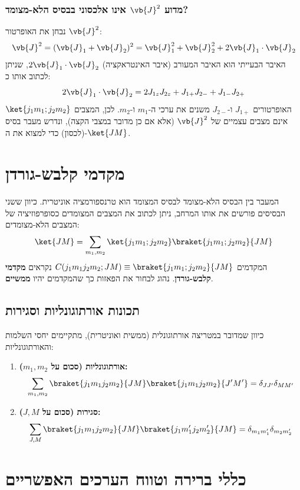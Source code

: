 \subsubsection{מדוע $\vb{J}^2$ אינו אלכסוני בבסיס הלא-מצומד?}
נבחן את האופרטור $\vb{J}^2$:
\[
\vb{J}^2 = (\vb{J}_1 + \vb{J}_2)^2 = \vb{J}_1^2 + \vb{J}_2^2 + 2\vb{J}_1 \cdot \vb{J}_2
\]
האיבר הבעייתי הוא האיבר המעורב (איבר האינטראקציה) $2\vb{J}_1 \cdot \vb{J}_2$, שניתן לכתוב אותו כ:
\[
2\vb{J}_1 \cdot \vb{J}_2 = 2J_{1z}J_{2z} + J_{1+}J_{2-} + J_{1-}J_{2+}
\]
האופרטורים $J_{1+}$ ו-$J_{2-}$ משנים את ערכי ה-$m_1$ ו-$m_2$. לכן, המצבים $\ket{j_1 m_1; j_2 m_2}$ אינם מצבים עצמיים של $\vb{J}^2$ (אלא אם כן מדובר במצבי הקצה), ונדרש מעבר בסיס (לכסון) כדי למצוא את ה-$\ket{J M}$.

\section{מקדמי קלבש-גורדן }

המעבר בין הבסיס הלא-מצומד לבסיס המצומד הוא טרנספורמציה אוניטרית. כיוון ששני הבסיסים פורשים את אותו המרחב, ניתן לכתוב את המצבים המצומדים כסופרפוזיציה של המצבים הלא-מצומדים:
\[
\ket{J M} = \sum_{m_1, m_2} \ket{j_1 m_1; j_2 m_2} \braket{j_1 m_1; j_2 m_2}{J M}
\]
המקדמים $C(j_1 m_1 j_2 m_2; J M) \equiv \braket{j_1 m_1; j_2 m_2}{J M}$ נקראים \textbf{מקדמי קלבש-גורדן}.
נהוג לבחור את הפאזות כך שהמקדמים יהיו \textbf{ממשיים}.

\subsection{תכונות אורתוגונליות וסגירות}
כיוון שמדובר במטריצה אורתוגונלית (ממשית ואוניטרית), מתקיימים יחסי השלמות והאורתוגונליות:
\begin{enumerate}
    \item \textbf{אורתוגונליות (סכום על $m_1, m_2$):}
    \[
    \sum_{m_1, m_2} \braket{j_1 m_1 j_2 m_2}{J M} \braket{j_1 m_1 j_2 m_2}{J' M'} = \delta_{JJ'} \delta_{MM'}
    \]
    \item \textbf{סגירות (סכום על $J, M$):}
    \[
    \sum_{J, M} \braket{j_1 m_1 j_2 m_2}{J M} \braket{j_1 m_1' j_2 m_2'}{J M} = \delta_{m_1 m_1'} \delta_{m_2 m_2'}
    \]
\end{enumerate}

\section{כללי ברירה וטווח הערכים האפשריים}

